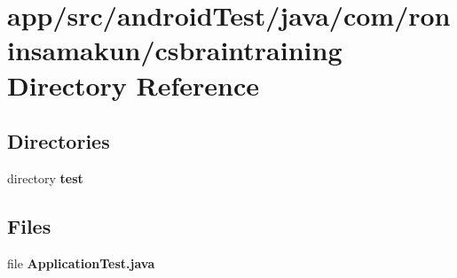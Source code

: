 \section{app/src/android\+Test/java/com/roninsamakun/csbraintraining Directory Reference}
\label{dir_9642b378c67b95b003dd15b3c1664a03}
\subsection*{Directories}
\begin{DoxyCompactItemize}
\item 
directory {\bf test}
\end{DoxyCompactItemize}
\subsection*{Files}
\begin{DoxyCompactItemize}
\item 
file {\bfseries Application\+Test.\+java}
\end{DoxyCompactItemize}
